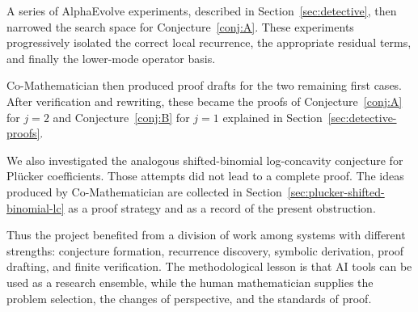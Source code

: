 \documentclass[11pt]{amsart}
\numberwithin{equation}{section}
\theoremstyle{remark}
\begin{document}
A series of AlphaEvolve experiments, described in
Section~\ref{sec:detective}, then narrowed the search space for
Conjecture~\ref{conj:A}.  These experiments progressively isolated the
correct local recurrence, the appropriate residual terms, and finally the
lower-mode operator basis.

Co-Mathematician then produced proof drafts for the two remaining first
cases.  After verification and rewriting, these became the proofs of
Conjecture~\ref{conj:A} for $j=2$ and Conjecture~\ref{conj:B} for
$j=1$ explained in Section~\ref{sec:detective-proofs}.

We also investigated the analogous shifted-binomial log-concavity
conjecture for Pl\"ucker coefficients.  Those attempts did not lead to a
complete proof.  The ideas produced by Co-Mathematician are collected in
Section~\ref{sec:plucker-shifted-binomial-lc} as a proof strategy and as a
record of the present obstruction.

Thus the project benefited from a division of work among systems with
different strengths: conjecture formation, recurrence discovery, symbolic
derivation, proof drafting, and finite verification.  The methodological
lesson is that AI tools can be used as a research ensemble, while the human
mathematician supplies the problem selection, the changes of perspective,
and the standards of proof.
\end{document}
